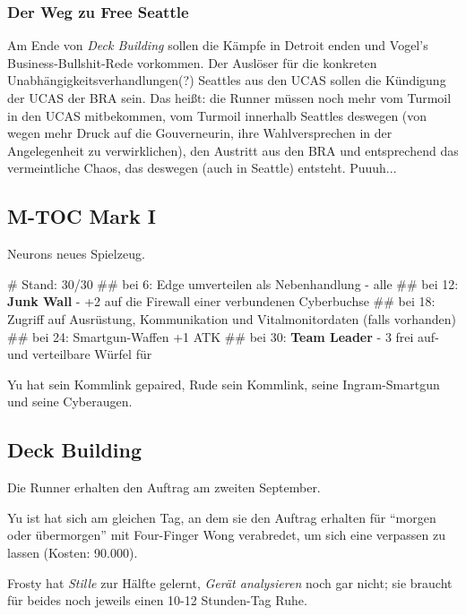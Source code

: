 

\subsubsection{Der Weg zu Free Seattle}

Am Ende von \textit{Deck Building} sollen die Kämpfe in Detroit enden und Vogel's Business-Bullshit-Rede vorkommen. Der Auslöser für die konkreten Unabhängigkeitsverhandlungen(?) Seattles aus den UCAS sollen die Kündigung der UCAS der BRA sein. Das heißt: die Runner müssen noch mehr vom Turmoil in den UCAS mitbekommen, vom Turmoil innerhalb Seattles deswegen (von wegen mehr Druck auf die Gouverneurin, ihre Wahlversprechen in der Angelegenheit zu verwirklichen), den Austritt aus den BRA und entsprechend das vermeintliche Chaos, das deswegen (auch in Seattle) entsteht. Puuuh...




\subsection{M-TOC Mark I}

Neurons neues Spielzeug.

\begin{easylist}
    # Stand: 30/30  
    ## bei 6: Edge umverteilen als Nebenhandlung - alle
    ## bei 12: \textbf{Junk Wall} - +2 auf die Firewall einer verbundenen Cyberbuchse
    ## bei 18: Zugriff auf Ausrüstung, Kommunikation und Vitalmonitordaten (falls vorhanden)
    ## bei 24: Smartgun-Waffen +1 ATK
    ## bei 30: \textbf{Team Leader} - 3 frei auf- und verteilbare Würfel für 
\end{easylist}

Yu hat sein Kommlink gepaired, Rude sein Kommlink, seine Ingram-Smartgun und seine Cyberaugen.




\subsection{Deck Building}

Die Runner erhalten den Auftrag am zweiten September.

Yu ist hat sich am gleichen Tag, an dem sie den Auftrag erhalten für ``morgen oder übermorgen'' mit Four-Finger Wong verabredet, um sich eine  verpassen zu lassen (Kosten: 90.000\nuyen).

Frosty hat \textit{Stille} zur Hälfte gelernt, \textit{Gerät analysieren} noch gar nicht; sie braucht für beides noch jeweils einen 10-12 Stunden-Tag Ruhe.
